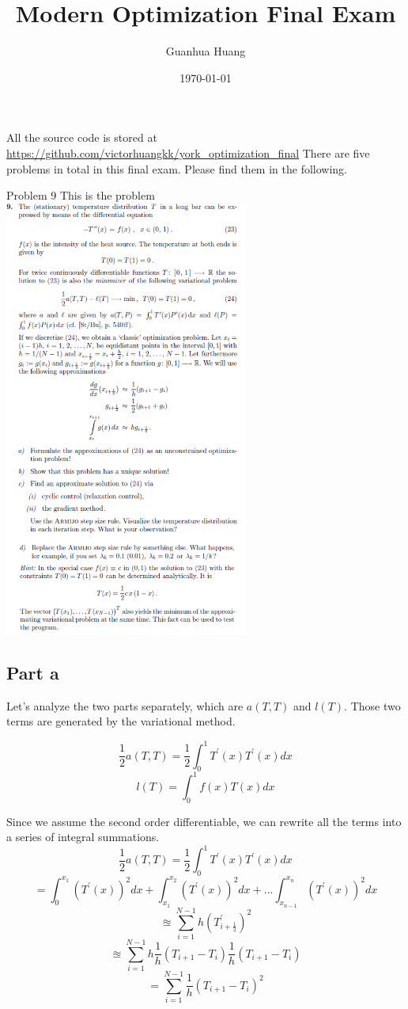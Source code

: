 \documentclass[10pt]{article}
\title{Modern Optimization Final Exam}
\author{Guanhua Huang}
\date\today
\begin{document}
\maketitle %
All the source code is stored at \url{https://github.com/victorhuangkk/york_optimization_final}
There are five problems in total in this final exam. Please find them in the following. 

\begin{section}{Problem 9}
This is the problem \\
\includegraphics[width=8cm]{img/problem9.png}
\subsection{Part a}

Let's analyze the two parts separately, which are $a(T, T)$ and $l(T)$. Those two terms are generated by the variational method. 

\[\frac{1}{2}a(T, T) = \frac{1}{2} \int_{0}^{1}T^\prime(x)T^{\prime}(x) dx\]
\[l(T) = \int_{0}^{1} f(x)T(x)dx\]

Since we assume the second order differentiable, we can rewrite all the terms into a series of integral summations. 
\[\frac{1}{2}a(T, T) = \frac{1}{2} \int_{0}^{1}T^\prime(x)T^{\prime}(x) dx\]
\[= \int_{0}^{x_1}(T^{\prime}(x))^2dx + \int_{x_1}^{x_2}(T^{\prime}(x))^2dx + ... \int_{x_{n-1}}^{x_n}(T^{\prime}(x))^2dx\]
\[\approxeq \sum_{i=1}^{N-1}h (T^{\prime}_{i+\frac{1}{2}})^2\]
\[\approxeq \sum_{i=1}^{N-1}h \frac{1}{h}(T_{i+1} - T_{i})\frac{1}{h}(T_{i+1} - T_{i})\]
\[= \sum_{i=1}^{N-1}\frac{1}{h}(T_{i+1} - T_{i})^2\]



\end{section}
\end{document}
